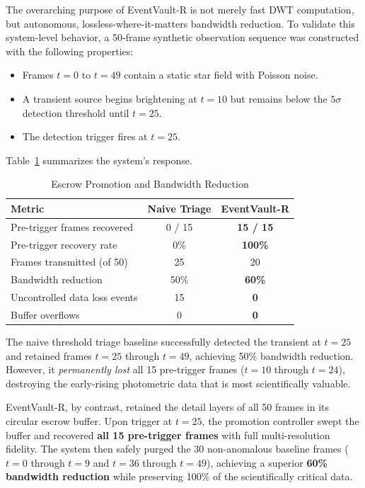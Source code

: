 \documentclass[conference]{IEEEtran}
\begin{document}
The overarching purpose of EventVault-R is not merely fast DWT computation, but autonomous, lossless-where-it-matters bandwidth reduction. To validate this system-level behavior, a 50-frame synthetic observation sequence was constructed with the following properties:

\begin{itemize}
    \item Frames $t=0$ to $t=49$ contain a static star field with Poisson noise.
    \item A transient source begins brightening at $t=10$ but remains below the $5\sigma$ detection threshold until $t=25$.
    \item The detection trigger fires at $t=25$.
\end{itemize}

Table~\ref{tab:escrow} summarizes the system's response.

\begin{table}[ht]
\centering
\caption{Escrow Promotion and Bandwidth Reduction}
\label{tab:escrow}
\begin{tabular}{@{}lcc@{}}
\toprule
\textbf{Metric} & \textbf{Naive Triage} & \textbf{EventVault-R} \\ \midrule
Pre-trigger frames recovered & 0 / 15 & \textbf{15 / 15} \\
Pre-trigger recovery rate & 0\% & \textbf{100\%} \\
Frames transmitted (of 50) & 25 & 20 \\
Bandwidth reduction & 50\% & \textbf{60\%} \\
Uncontrolled data loss events & 15 & \textbf{0} \\
Buffer overflows & 0 & \textbf{0} \\ \bottomrule
\end{tabular}
\end{table}

The naive threshold triage baseline successfully detected the transient at $t=25$ and retained frames $t=25$ through $t=49$, achieving 50\% bandwidth reduction. However, it \textit{permanently lost} all 15 pre-trigger frames ($t=10$ through $t=24$), destroying the early-rising photometric data that is most scientifically valuable.

EventVault-R, by contrast, retained the detail layers of all 50 frames in its circular escrow buffer. Upon trigger at $t=25$, the promotion controller swept the buffer and recovered \textbf{all 15 pre-trigger frames} with full multi-resolution fidelity. The system then safely purged the 30 non-anomalous baseline frames ($t=0$ through $t=9$ and $t=36$ through $t=49$), achieving a superior \textbf{60\% bandwidth reduction} while preserving 100\% of the scientifically critical data.
\end{document}
